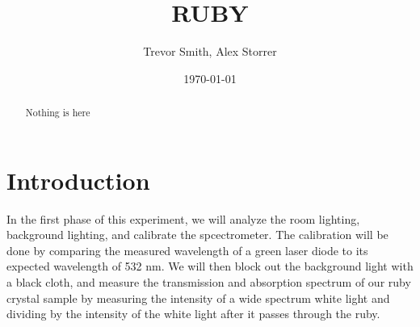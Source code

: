\documentclass[aps,prl,reprint]{revtex4-2}
\begin{document}

\title{RUBY}


\author{Trevor Smith, Alex Storrer}


\date{\today}

\begin{abstract}
	Nothing is here
\end{abstract}


\maketitle

\section{Introduction}
In the first phase of this experiment, we will analyze the room lighting, background 
lighting, and calibrate the spcectrometer. The calibration will be done by comparing
the measured wavelength of a green laser diode to its expected wavelength of 532 nm. 
We will then block out the background light with a black cloth, and
measure the transmission and absorption spectrum of our ruby crystal sample
by measuring the intensity of a wide spectrum white light and dividing by the 
intensity of the white light after it passes through the ruby. \\
\end{document}
